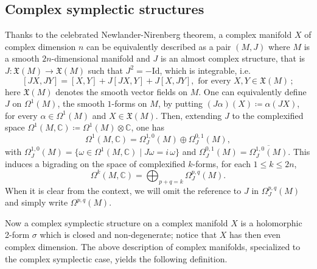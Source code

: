 \documentclass[a4paper]{amsart}
\theoremstyle{definition}
\theoremstyle{remark}
\numberwithin{equation}{section}
\begin{document}


\subsection{Complex symplectic structures} Thanks to the celebrated Newlander-Nirenberg theorem, a complex manifold $X$ of complex dimension $n$ can be equivalently described as a pair $(M,J)$ where $M$ is a smooth $2n$-dimensional manifold and $J$ is an almost complex structure, that is $J\colon \mathfrak X(M)\to \mathfrak X(M)$ such that $J^2=-\mathrm{Id}$, which is integrable, i.e.
\[
[JX,JY]=[X,Y]+J[JX,Y]+J[X,JY], \text{ for every }X,Y\in\mathfrak X(M)\,;
\]
here $\mathfrak X(M)$ denotes the smooth vector fields on $M$. One can equivalently define $J$ on $\Omega^1(M)$, the smooth $1$-forms on $M$, by putting $(J\alpha)(X)\coloneqq\alpha(JX)$, for every $\alpha\in\Omega^1(M)$ and $X\in\mathfrak X(M)$. Then, extending $J$ to the complexified space $\Omega^1(M,\mathbb C)\coloneqq\Omega^1(M)\otimes\mathbb C$, one has
$$\Omega^1(M,\mathbb C)=\Omega_J^{1,0}(M)\oplus\Omega_J^{0,1}(M),$$
with $\Omega_J^{1,0}(M)=\{\omega\in\Omega^1(M,\mathbb C)\mid J\omega=i\,\omega\}$ and 
$\Omega_J^{0,1}(M)=\overline{\Omega_J^{1,0}(M)}$. This induces a bigrading on the space of complexified $k$-forms, for each $1\leq k\leq 2n$,
\begin{equation}\label{bigraduation}
\Omega^{k}(M,\mathbb C)=\bigoplus_{p+q=k}\Omega_J^{p,q}(M).
\end{equation}
When it is clear from the context, we will omit the reference to $J$ in $\Omega_J^{p,q}(M)$ and simply write $\Omega^{p,q}(M)$.

Now a complex symplectic structure on a complex manifold $X$ is a holomorphic 2-form $\sigma$ which is closed and non-degenerate; notice that $X$ has then even complex dimension. The above description of complex manifolds, specialized to the complex symplectic case, yields the following definition.
\end{document}
